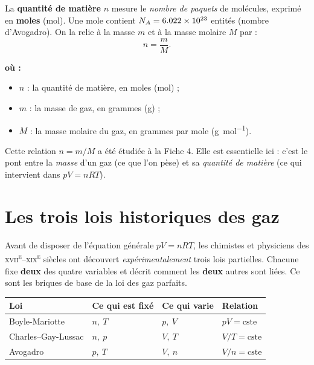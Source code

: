 \documentclass[11pt,a4paper]{article}
\newenvironment{ou}{%
  \par\smallskip\noindent\textbf{où :}\nopagebreak
  \begin{itemize}[leftmargin=1.8em,topsep=2pt,itemsep=1.5pt,parsep=0pt]}%
  {\end{itemize}}
\newcommand{\GP}{gaz parfaits}
\begin{document}
\begin{definition}
La \textbf{quantité de matière} $n$ mesure le \emph{nombre de paquets} de molécules, exprimé en
\textbf{moles} (\si{\mole}). Une mole contient $N_A=\qty{6{,}022e23}{}$ entités (nombre d'Avogadro). On
la relie à la masse $m$ et à la masse molaire $M$ par :
\[ n=\frac{m}{M}. \]
\end{definition}

\begin{ou}
  \item $n$ : la quantité de matière, en moles (\si{\mole}) ;
  \item $m$ : la masse de gaz, en grammes (\si{\gram}) ;
  \item $M$ : la masse molaire du gaz, en grammes par mole (\si{\gram\per\mole}).
\end{ou}

\begin{remarque}
Cette relation $n=m/M$ a été étudiée à la Fiche 4. Elle est essentielle ici : c'est le pont entre la
\emph{masse} d'un gaz (ce que l'on pèse) et sa \emph{quantité de matière} (ce qui intervient dans
$pV=nRT$).
\end{remarque}

\section{Les trois lois historiques des gaz}
Avant de disposer de l'équation générale $pV=nRT$, les chimistes et physiciens des
\textsc{xvii\textsuperscript{e}}--\textsc{xix\textsuperscript{e}} siècles ont découvert
\emph{expérimentalement} trois lois partielles. Chacune fixe \textbf{deux} des quatre variables et
décrit comment les \textbf{deux} autres sont liées. Ce sont les briques de base de la loi des \GP.

\begin{center}\renewcommand{\arraystretch}{1.4}
\begin{tabular}{l l l l}
\toprule
\rowcolor{primary!12}
\textbf{Loi} & \textbf{Ce qui est fixé} & \textbf{Ce qui varie} & \textbf{Relation}\\
\midrule
Boyle-Mariotte       & $n,\ T$ & $p,\ V$ & $pV=\text{cste}$\\
Charles--Gay-Lussac  & $n,\ p$ & $V,\ T$ & $V/T=\text{cste}$\\
Avogadro             & $p,\ T$ & $V,\ n$ & $V/n=\text{cste}$\\
\bottomrule
\end{tabular}
\end{center}
\end{document}
